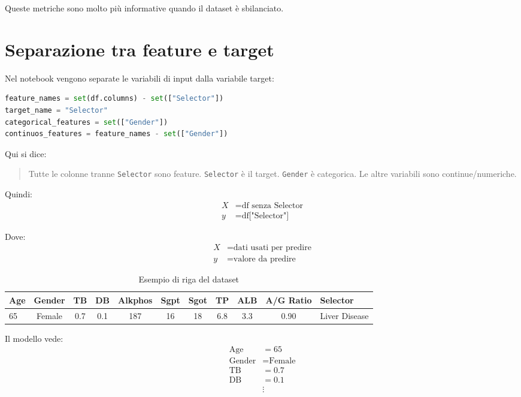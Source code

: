 \documentclass[11pt,a4paper]{article}
\begin{document}
Queste metriche sono molto più informative quando il dataset è sbilanciato.

\section{Separazione tra feature e target}
Nel notebook vengono separate le variabili di input dalla variabile target:

\begin{lstlisting}[language=Python]
feature_names = set(df.columns) - set(["Selector"])
target_name = "Selector"
categorical_features = set(["Gender"])
continuos_features = feature_names - set(["Gender"])
\end{lstlisting}

Qui si dice:
\begin{quote}
    Tutte le colonne tranne \texttt{Selector} sono feature. \texttt{Selector} è il target. \texttt{Gender} è categorica. Le altre variabili sono continue/numeriche.
\end{quote}

Quindi:
\begin{align*}
    X &= \text{df senza Selector} \\
    y &= \text{df["Selector"]}
\end{align*}

Dove:
\begin{align*}
    X &= \text{dati usati per predire} \\
    y &= \text{valore da predire}
\end{align*}

\begin{table}[H]
\centering
\caption{Esempio di riga del dataset}
\label{tab:dataset_example}
\begin{tabular}{lcccccccccl}
\toprule
\textbf{Age} & \textbf{Gender} & \textbf{TB} & \textbf{DB} & \textbf{Alkphos} & \textbf{Sgpt} & \textbf{Sgot} & \textbf{TP} & \textbf{ALB} & \textbf{A/G Ratio} & \textbf{Selector} \\
\midrule
65 & Female & 0.7 & 0.1 & 187 & 16 & 18 & 6.8 & 3.3 & 0.90 & Liver Disease \\
\bottomrule
\end{tabular}
\end{table}

Il modello vede:
\begin{align*}
    \text{Age} &= 65 \\
    \text{Gender} &= \text{Female} \\
    \text{TB} &= 0.7 \\
    \text{DB} &= 0.1 \\
    &\vdots
\end{align*}
\end{document}
